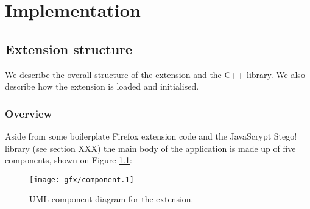 \chapter{Implementation}\label{ch:implementation}

\FloatBarrier
\section{Extension structure}

We describe the overall structure of the extension and the C++ library. We also describe how the extension is loaded and initialised.

\subsection{Overview}

    Aside from some boilerplate Firefox extension code and the JavaScrypt Stego! library (see section XXX) the main body of the application is made up of five components, shown on Figure \ref{uml:component}:

    \begin{figure}[tb]
        \begin{center}
                \texttt{[image: gfx/component.1]}
            \caption{UML component diagram for the extension.}
            \label{uml:component}
        \end{center}
    \end{figure}
    

